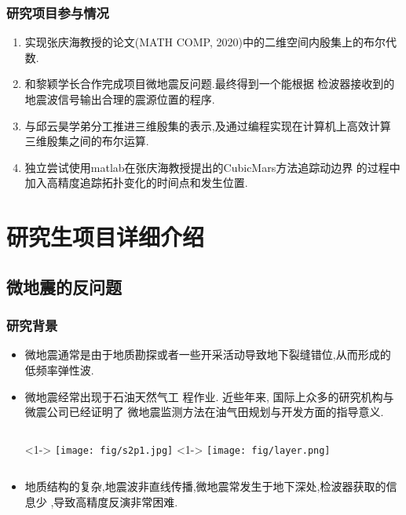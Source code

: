 \documentclass[UTF8]{ctexbeamer}	%
\theoremstyle{plain}
\theoremstyle{definition}
\theoremstyle{remark}
\numberwithin{equation}{section}
\begin{document}
\begin{frame}[fragile]
   \frametitle{研究项目参与情况}
    \small{\begin{enumerate}
        \item 实现张庆海教授的论文(MATH COMP, 2020)中的二维空间内殷集上的布尔代数.
        \item 和黎颖学长合作完成项目微地震反问题.最终得到一个能根据
        检波器接收到的地震波信号输出合理的震源位置的程序.
        \item 与邱云昊学弟分工推进三维殷集的表示,及通过编程实现在计算机上高效计算
        三维殷集之间的布尔运算.
        \item 独立尝试使用matlab在张庆海教授提出的CubicMars方法追踪动边界
        的过程中加入高精度追踪拓扑变化的时间点和发生位置.
    \end{enumerate}}
\end{frame}

\section{研究生项目详细介绍}
\subsection{微地震的反问题}

\begin{frame}[fragile]
    \frametitle{研究背景}
    \begin{itemize}
        \item  微地震通常是由于地质勘探或者一些开采活动导致地下裂缝错位,从而形成的
        低频率弹性波.
        \item 微地震经常出现于石油天然气工
        程作业. 近些年来, 国际上众多的研究机构与微震公司已经证明了
        微地震监测方法在油气田规划与开发方面的指导意义.
        \begin{columns}
            <1->
                \texttt{[image: fig/s2p1.jpg]}
            <1->
            \texttt{[image: fig/layer.png]}
        \end{columns}
        \item 地质结构的复杂,地震波非直线传播,微地震常发生于地下深处,检波器获取的信息少
        ,导致高精度反演非常困难. 
    \end{itemize}
\end{frame}
\end{document}
